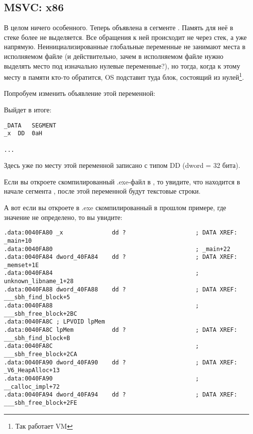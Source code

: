 \subsection{MSVC: x86}



В целом ничего особенного. Теперь  объявлена в сегменте . 
Память для неё в стеке более не выделяется.
Все обращения к ней происходит не через стек, а уже напрямую. 
Неинициализированные глобальные переменные не занимают места в исполняемом файле
(и действительно, зачем в исполняемом файле
нужно выделять место под изначально нулевые переменные?), но тогда, когда к этому месту в памяти
кто-то обратится, \ac{OS} подставит туда блок, состоящий из нулей\footnote{Так работает \ac{VM}}.

Попробуем изменить объявление этой переменной:



Выйдет в итоге:

\begin{lstlisting}
_DATA	SEGMENT
_x	DD	0aH

...
\end{lstlisting}

Здесь уже по месту этой переменной записано  с типом DD (dword = 32 бита).

Если вы откроете скомпилированный .exe-файл в \IDA, то увидите, что  
находится в начале сегмента , после этой переменной будут текстовые строки.

А вот если вы откроете в \IDA .exe скомпилированный в прошлом примере, где значение  не определено, то вы увидите:

\begin{lstlisting}
.data:0040FA80 _x              dd ?                    ; DATA XREF: _main+10
.data:0040FA80                                         ; _main+22
.data:0040FA84 dword_40FA84    dd ?                    ; DATA XREF: _memset+1E
.data:0040FA84                                         ; unknown_libname_1+28
.data:0040FA88 dword_40FA88    dd ?                    ; DATA XREF: ___sbh_find_block+5
.data:0040FA88                                         ; ___sbh_free_block+2BC
.data:0040FA8C ; LPVOID lpMem
.data:0040FA8C lpMem           dd ?                    ; DATA XREF: ___sbh_find_block+B
.data:0040FA8C                                         ; ___sbh_free_block+2CA
.data:0040FA90 dword_40FA90    dd ?                    ; DATA XREF: _V6_HeapAlloc+13
.data:0040FA90                                         ; __calloc_impl+72
.data:0040FA94 dword_40FA94    dd ?                    ; DATA XREF: ___sbh_free_block+2FE
\end{lstlisting}

